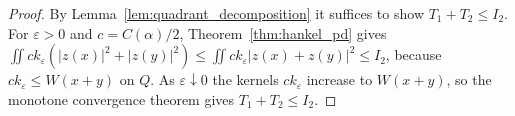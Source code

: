 \begin{proof}
\leanok
By Lemma~\ref{lem:quadrant_decomposition} it suffices to show $T_1 + T_2 \le I_2$. For $\varepsilon > 0$ and $c = C(\alpha)/2$, Theorem~\ref{thm:hankel_pd} gives $\iint c k_\varepsilon(\lvert z(x)\rvert^2 + \lvert z(y)\rvert^2) \le \iint c k_\varepsilon \lvert z(x) + z(y)\rvert^2 \le I_2$, because $c k_\varepsilon \le W(x + y)$ on $Q$. As $\varepsilon \downarrow 0$ the kernels $c k_\varepsilon$ increase to $W(x + y)$, so the monotone convergence theorem gives $T_1 + T_2 \le I_2$.
\end{proof}
